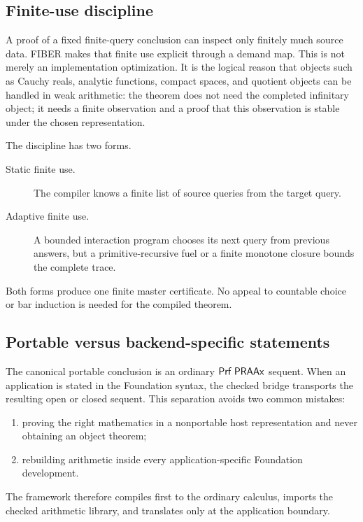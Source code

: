 \subsection{Finite-use discipline}

A proof of a fixed finite-query conclusion can inspect only finitely much
source data.  FIBER makes that finite use explicit through a demand map.  This
is not merely an implementation optimization.  It is the logical reason that
objects such as Cauchy reals, analytic functions, compact spaces, and quotient
objects can be handled in weak arithmetic: the theorem does not need the
completed infinitary object; it needs a finite observation and a proof that
this observation is stable under the chosen representation.

The discipline has two forms.

\begin{description}
\item[Static finite use.] The compiler knows a finite list of source queries
      from the target query.
\item[Adaptive finite use.] A bounded interaction program chooses its next
      query from previous answers, but a primitive-recursive fuel or a finite
      monotone closure bounds the complete trace.
\end{description}

Both forms produce one finite master certificate.  No appeal to countable
choice or bar induction is needed for the compiled theorem.

\subsection{Portable versus backend-specific statements}

The canonical portable conclusion is an ordinary \(\mathsf{Prf}\;\mathsf{PRAAx}\) sequent.
When an application is stated in the Foundation syntax, the checked bridge
transports the resulting open or closed sequent.  This separation avoids two
common mistakes:

\begin{enumerate}
\item proving the right mathematics in a nonportable host representation and
      never obtaining an object theorem;
\item rebuilding arithmetic inside every application-specific Foundation
      development.
\end{enumerate}

The framework therefore compiles first to the ordinary calculus, imports the
checked arithmetic library, and translates only at the application boundary.
